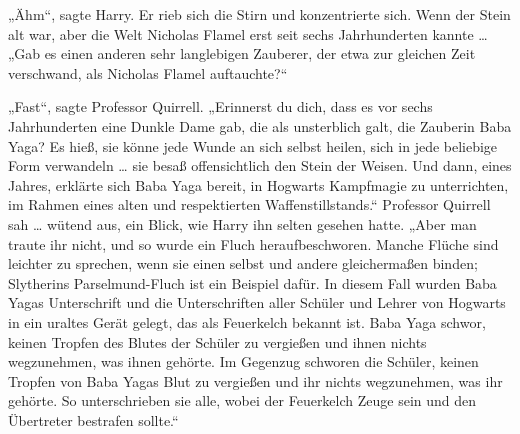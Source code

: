 „Ähm“, sagte Harry.
Er rieb sich die Stirn und konzentrierte sich.
Wenn der Stein alt war, aber die Welt Nicholas Flamel erst seit sechs Jahrhunderten kannte …
„Gab es einen anderen sehr langlebigen Zauberer, der etwa zur gleichen Zeit verschwand, als Nicholas Flamel auftauchte?“

„Fast“, sagte Professor Quirrell.
„Erinnerst du dich, dass es vor sechs Jahrhunderten eine Dunkle Dame gab, die als unsterblich galt, die Zauberin Baba Yaga? Es hieß, sie könne jede Wunde an sich selbst heilen, sich in jede beliebige Form verwandeln … sie besaß offensichtlich den Stein der Weisen. Und dann, eines Jahres, erklärte sich Baba Yaga bereit, in Hogwarts Kampfmagie zu unterrichten, im Rahmen eines alten und respektierten Waffenstillstands.“
Professor Quirrell sah … wütend aus, ein Blick, wie Harry ihn selten gesehen hatte.
„Aber man traute ihr nicht, und so wurde ein Fluch heraufbeschworen. Manche Flüche sind leichter zu sprechen, wenn sie einen selbst und andere gleichermaßen binden; Slytherins Parselmund-Fluch ist ein Beispiel dafür. In diesem Fall wurden Baba Yagas Unterschrift und die Unterschriften aller Schüler und Lehrer von Hogwarts in ein uraltes Gerät gelegt, das als Feuerkelch bekannt ist. Baba Yaga schwor, keinen Tropfen des Blutes der Schüler zu vergießen und ihnen nichts wegzunehmen, was ihnen gehörte. Im Gegenzug schworen die Schüler, keinen Tropfen von Baba Yagas Blut zu vergießen und ihr nichts wegzunehmen, was ihr gehörte. So unterschrieben sie alle, wobei der Feuerkelch Zeuge sein und den Übertreter bestrafen sollte.“

